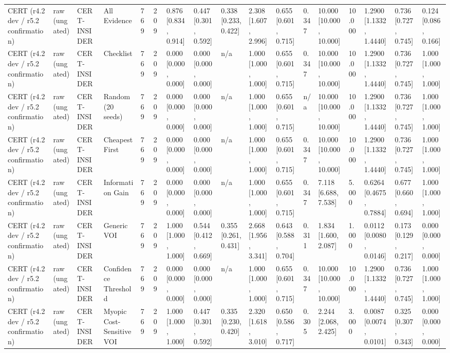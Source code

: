 \begin{table}[!ht]
{\begin{tabular}{lllllllllllllllll}
CERT (r4.2 dev / r5.2 confirmation) & raw (ungated) & CERT-INSIDER & All Evidence & 769 & 209 & 0.876 [0.834, 0.914] & 0.447 [0.301, 0.592] & 0.338 [0.233, 0.422] & 2.308 [1.607, 2.996] & 0.655 [0.601, 0.715] & 0.347 & 10.000 [10.000, 10.000] & 10.000 & 1.2900 [1.1332, 1.4440] & 0.736 [0.727, 0.745] & 0.124 [0.086, 0.166] \\
CERT (r4.2 dev / r5.2 confirmation) & raw (ungated) & CERT-INSIDER & Checklist & 769 & 209 & 0.000 [0.000, 0.000] & 0.000 [0.000, 0.000] & n/a & 1.000 [1.000, 1.000] & 0.655 [0.601, 0.715] & 0.347 & 10.000 [10.000, 10.000] & 10.000 & 1.2900 [1.1332, 1.4440] & 0.736 [0.727, 0.745] & 1.000 [1.000, 1.000] \\
CERT (r4.2 dev / r5.2 confirmation) & raw (ungated) & CERT-INSIDER & Random (20 seeds) & 769 & 209 & 0.000 [0.000, 0.000] & 0.000 [0.000, 0.000] & n/a & 1.000 [1.000, 1.000] & 0.655 [0.601, 0.715] & n/a & 10.000 [10.000, 10.000] & 10.000 & 1.2900 [1.1332, 1.4440] & 0.736 [0.727, 0.745] & 1.000 [1.000, 1.000] \\
CERT (r4.2 dev / r5.2 confirmation) & raw (ungated) & CERT-INSIDER & Cheapest First & 769 & 209 & 0.000 [0.000, 0.000] & 0.000 [0.000, 0.000] & n/a & 1.000 [1.000, 1.000] & 0.655 [0.601, 0.715] & 0.347 & 10.000 [10.000, 10.000] & 10.000 & 1.2900 [1.1332, 1.4440] & 0.736 [0.727, 0.745] & 1.000 [1.000, 1.000] \\
CERT (r4.2 dev / r5.2 confirmation) & raw (ungated) & CERT-INSIDER & Information Gain & 769 & 209 & 0.000 [0.000, 0.000] & 0.000 [0.000, 0.000] & n/a & 1.000 [1.000, 1.000] & 0.655 [0.601, 0.715] & 0.347 & 7.118 [6.688, 7.538] & 5.000 & 0.6264 [0.4675, 0.7884] & 0.677 [0.660, 0.694] & 1.000 [1.000, 1.000] \\
CERT (r4.2 dev / r5.2 confirmation) & raw (ungated) & CERT-INSIDER & Generic VOI & 769 & 209 & 1.000 [1.000, 1.000] & 0.544 [0.412, 0.669] & 0.355 [0.261, 0.431] & 2.668 [1.956, 3.341] & 0.643 [0.588, 0.704] & 0.311 & 1.834 [1.600, 2.087] & 1.000 & 0.0112 [0.0080, 0.0146] & 0.173 [0.129, 0.217] & 0.000 [0.000, 0.000] \\
CERT (r4.2 dev / r5.2 confirmation) & raw (ungated) & CERT-INSIDER & Confidence Threshold & 769 & 209 & 0.000 [0.000, 0.000] & 0.000 [0.000, 0.000] & n/a & 1.000 [1.000, 1.000] & 0.655 [0.601, 0.715] & 0.347 & 10.000 [10.000, 10.000] & 10.000 & 1.2900 [1.1332, 1.4440] & 0.736 [0.727, 0.745] & 1.000 [1.000, 1.000] \\
CERT (r4.2 dev / r5.2 confirmation) & raw (ungated) & CERT-INSIDER & Myopic Cost-Sensitive VOI & 769 & 209 & 1.000 [1.000, 1.000] & 0.447 [0.301, 0.592] & 0.335 [0.230, 0.420] & 2.320 [1.618, 3.010] & 0.650 [0.586, 0.717] & 0.305 & 2.244 [2.068, 2.425] & 3.000 & 0.0087 [0.0074, 0.0101] & 0.325 [0.307, 0.343] & 0.000 [0.000, 0.000] \\

\end{tabular}}
\end{table}
